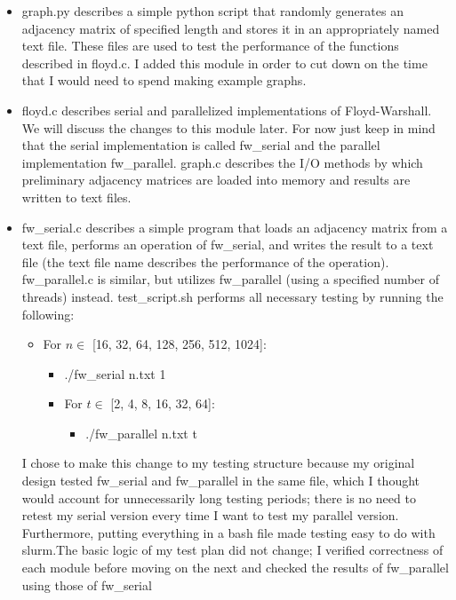 \documentclass[]{article}
\begin{document}
	\begin{itemize}
		\item graph.py describes a simple python script that randomly generates an adjacency matrix of specified length and stores it in an appropriately named text file. These files are used to test the performance of the functions described in floyd.c. I added this module in order to cut down on the time that I would need to spend making example graphs.
		\item floyd.c describes serial and parallelized implementations of Floyd-Warshall. We will discuss the changes to this module later. For now just keep in mind that the serial implementation is called fw\_serial and the parallel implementation fw\_parallel. graph.c describes the I/O methods by which preliminary adjacency matrices are loaded into memory and results are written to text files.
		\item fw\_serial.c describes a simple program that loads an adjacency matrix from a text file, performs an operation of fw\_serial, and writes the result to a text file (the text file name describes the performance of the operation). fw\_parallel.c is similar, but utilizes fw\_parallel (using a specified number of threads) instead. test\_script.sh performs all necessary testing by running the following:
		\begin{itemize}
			\item For $n \in$ [16, 32, 64, 128, 256, 512, 1024]:
			\begin{itemize}
				\item ./fw\_serial n.txt 1
				\item For $t \in$ [2, 4, 8, 16, 32, 64]:
				\begin{itemize}
					\item ./fw\_parallel n.txt t
				\end{itemize}
			\end{itemize}
		\end{itemize}
		I chose to make this change to my testing structure because my original design tested fw\_serial and fw\_parallel in the same file, which I thought would account for unnecessarily long testing periods; there is no need to retest my serial version every time I want to test my parallel version. Furthermore, putting everything in a bash file made testing easy to do with slurm.The basic logic of my test plan did not change; I verified correctness of each module before moving on the next and checked the results of fw\_parallel using those of fw\_serial
	\end{itemize}
\end{document}
